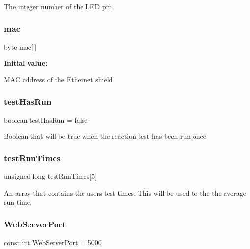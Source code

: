 The integer number of the L\+ED pin \mbox{\label{test_8ino_aea3f7775fecafb66a619eb2dcb0357bd}} 
\subsubsection{\texorpdfstring{mac}{mac}}
{\footnotesize\ttfamily byte mac\mbox{[}$\,$\mbox{]}}

{\bfseries Initial value\+:}
\begin{DoxyCode}{0}
\DoxyCodeLine{= \{}
\DoxyCodeLine{\}}

\end{DoxyCode}
M\+AC address of the Ethernet shield \mbox{\label{test_8ino_a9c86e8e71b0cc50fc8b7362cf5dfe382}} 
\subsubsection{\texorpdfstring{testHasRun}{testHasRun}}
{\footnotesize\ttfamily boolean test\+Has\+Run = false}

Boolean that will be true when the reaction test has been run once \mbox{\label{test_8ino_ac462bdb2739adfafcdc80951a7ca009a}} 
\subsubsection{\texorpdfstring{testRunTimes}{testRunTimes}}
{\footnotesize\ttfamily unsigned long test\+Run\+Times\mbox{[}5\mbox{]}}

An array that contains the user\textquotesingle{}s test times. This will be used to the the average run time. \mbox{\label{test_8ino_af37b150d7960fc164e55cf58aade65a3}} 
\subsubsection{\texorpdfstring{WebServerPort}{WebServerPort}}
{\footnotesize\ttfamily const int Web\+Server\+Port = 5000}

